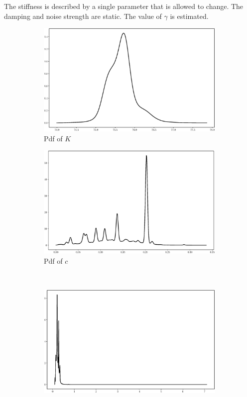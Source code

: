 \documentclass[]{elsarticle}
\begin{document}
The stiffness is described by a single parameter that is allowed to change. The damping and noise strength are static. The value of $\gamma$ is estimated. 

\begin{figure}[!htb]
\centering
\begin{subfigure}{.49\textwidth}
\includegraphics[width=\linewidth,keepaspectratio]{./figs/Case00/Model5_k.eps}
\caption{Pdf of $K$}
\end{subfigure}
\begin{subfigure}{.49\textwidth}
\centering
\includegraphics[width=\linewidth,keepaspectratio]{./figs/Case00/Model5_c.eps}
\caption{Pdf of $c$}
\label{fig:s1c}
\end{subfigure}\\
\begin{subfigure}{.49\textwidth}
\centering
\includegraphics[width=\linewidth,keepaspectratio]{./figs/Case00/Model5_tau.eps}

\end{subfigure}
\end{figure}
\end{document}
